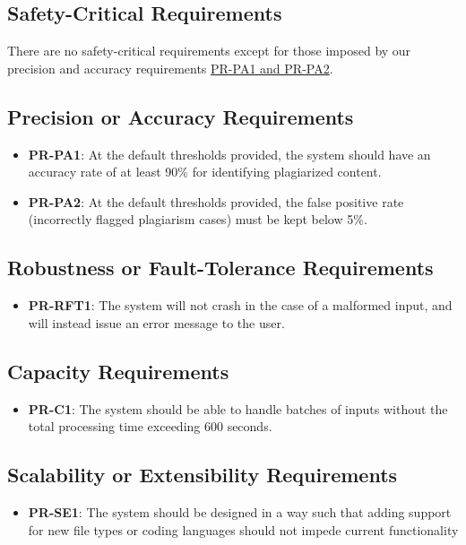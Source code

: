 \documentclass[12pt]{article}
\begin{document}
\subsection{Safety-Critical Requirements}
There are no safety-critical requirements except for those imposed by our 
precision and accuracy requirements \hyperlink{subsection.12.3}{PR-PA1 and PR-PA2}.
\subsection{Precision or Accuracy Requirements}
\begin{itemize}
    \item \textbf{PR-PA1}: At the default thresholds provided, the system should 
    have an accuracy rate of at least 90\% for identifying plagiarized content.
    \item \textbf{PR-PA2}: At the default thresholds provided, the false positive 
    rate (incorrectly flagged plagiarism cases) must be kept below 5\%.
\end{itemize}
\subsection{Robustness or Fault-Tolerance Requirements}
\begin{itemize}
    \item \textbf{PR-RFT1}: The system will not crash in the case of a malformed input, and will instead issue an error message to the user.
\end{itemize}
\subsection{Capacity Requirements}
\begin{itemize}
    \item \textbf{PR-C1}: The system should be able to handle batches of inputs without the total processing time exceeding 600 seconds.
\end{itemize}
\subsection{Scalability or Extensibility Requirements}
\begin{itemize}
    \item \textbf{PR-SE1}: The system should be designed in a way such that adding support for new file types or coding languages should not impede current functionality
\end{itemize}
\end{document}
